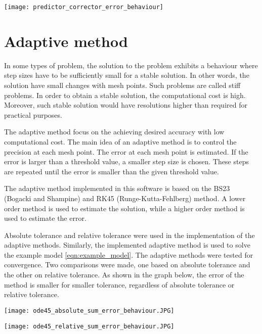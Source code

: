 \texttt{[image: predictor\_corrector\_error\_behaviour]}

\section{Adaptive method}
In some types of problem, the solution to the problem exhibits a behaviour where step sizes have to be sufficiently small for a stable solution. In other words, the solution have small changes with mesh points. Such problems are called stiff problems. In order to obtain a stable solution, the computational cost is high. Moreover, such stable solution would have resolutions higher than required for practical purposes.

The adaptive method focus on the achieving desired accuracy with low computational cost. The main idea of an adaptive method is to control the precision at each mesh point. The error at each mesh point is estimated. If the error is larger than a threshold value, a smaller step size is chosen. These steps are repeated until the error is smaller than the given threshold value.

The adaptive method implemented in this software is based on the BS23 (Bogacki and Shampine) and RK45 (Runge-Kutta-Fehlberg) method. A lower order method is used to estimate the solution, while a higher order method is used to estimate the error. 

Absolute tolerance and relative tolerance were used in the implementation of the adaptive methods. Similarly, the implemented adaptive method is used to solve the example model \ref{eqn:example_model}. The adaptive methods were tested for convergence. Two comparisons were made, one based on absolute tolerance and the other on relative tolerance. As shown in the graph below, the error of the method is smaller for smaller tolerance, regardless of absolute tolerance or relative tolerance.

\texttt{[image: ode45\_absolute\_sum\_error\_behaviour.JPG]}

\texttt{[image: ode45\_relative\_sum\_error\_behaviour.JPG]}